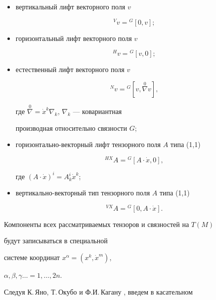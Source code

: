 \begin{itemize} 


\item[1)] вертикальный лифт векторного поля $v$ 


$$ 


{}^Vv={}^G[0,v]; 


$$ 


\item[2)] горизонтальный лифт векторного поля $v$ 


$$ 


{}^Hv={}^G[v,0]; 


$$ 


\item[3)] естественный лифт векторного поля $v$ 


$$ 


{}^Nv={}^G[v,\overset{0}{\nabla}v], 


$$ 


где $\overset{0}{\nabla}=\Dot x^k\nabla_k$, $\nabla _k$ --- ковариантная 


производная относительно связности $G$; 


\item[4)] горизонтально-векторный лифт тензорного поля $A$ типа (1,1) 


$$ 


{}^{HX}A={}^G[A\cdot\Dot x,0], 


$$ 


где $(A\cdot\Dot x)^i=A{}^i_k\Dot x^k$; 


\item[5)] вертикально-векторный тип тензорного поля $A$ типа (1,1) 


$$ 


{}^{VX}A={}^G[0,A\cdot\Dot x]. 


$$ 


\end{itemize} 


 


Компоненты всех рассматриваемых тензоров и связностей на $T(M)$


будут записываться в специальной 


системе координат $x^\alpha=(x^k,\Dot x^m)$, 


$\alpha,\beta,\gamma\dotsc=1,\dotsc,2n$. 


 


Следуя К.\,Яно, Т.\,Окубо и Ф.И.\,Кагану \cite{Kag2}, введем в касательном 


